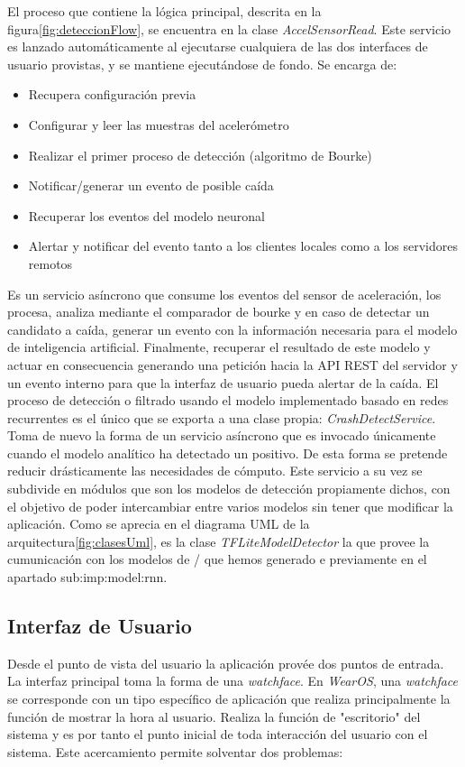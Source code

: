 
El proceso que contiene la lógica principal, descrita en la figura\ref{fig:deteccionFlow}, se encuentra en la clase \textit{AccelSensorRead}. Este servicio es lanzado automáticamente al ejecutarse cualquiera de las dos interfaces de usuario provistas, y se mantiene ejecutándose de fondo. Se encarga de:

\begin{itemize}
  \item Recupera configuración previa
  \item Configurar y leer las muestras del acelerómetro
  \item Realizar el primer proceso de detección (algoritmo de Bourke)
  \item Notificar/generar un evento de posible caída
  \item Recuperar los eventos del modelo neuronal
  \item Alertar y notificar del evento tanto a los clientes locales como a los servidores remotos
\end{itemize}


Es un servicio asíncrono que consume los eventos del sensor de aceleración, los procesa, analiza mediante el comparador de bourke y en caso de detectar un candidato a caída, generar un evento con la información necesaria para el modelo de inteligencia artificial. Finalmente, recuperar el resultado de este modelo y actuar en consecuencia generando una petición hacia la API REST del servidor y un evento interno para que la interfaz de usuario pueda alertar de la caída.
El proceso de detección o filtrado usando el modelo implementado basado en redes recurrentes es el único que se exporta a una clase propia: \textit{CrashDetectService}. Toma de nuevo la forma de un servicio asíncrono que es invocado únicamente cuando el modelo analítico ha detectado un positivo. De esta forma se pretende reducir drásticamente las necesidades de cómputo. Este servicio a su vez se subdivide en módulos que son los modelos de detección propiamente dichos, con el objetivo de poder intercambiar entre varios modelos sin tener que modificar la aplicación. Como se aprecia en el diagrama UML de la arquitectura\ref{fig:clasesUml}, es la clase \textit{TFLiteModelDetector} la que provee la cumunicación con los modelos de \tflite/ que hemos generado e previamente en el apartado \refname{sub:imp:model:rnn}. 


\subsection{Interfaz de Usuario}
Desde el punto de vista del usuario la aplicación provée dos puntos de entrada. La interfaz principal toma la forma de una \textit{watchface}. En \textit{WearOS}, una \textit{watchface} se corresponde con un tipo específico de aplicación que realiza principalmente la función de mostrar la hora al usuario. Realiza la función de "escritorio" del sistema y es por tanto el punto inicial de toda interacción del usuario con el sistema. Este acercamiento permite solventar dos problemas:

